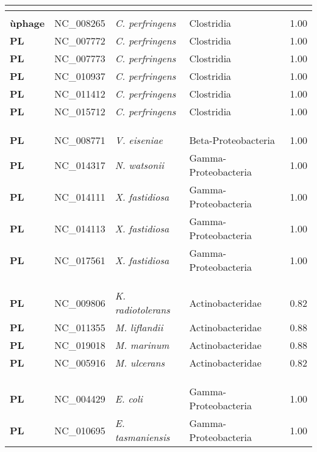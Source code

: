 \begin{adjustwidth}{-3cm}{2cm}
{\begin{supertabular}{>{\bfseries}l|p{0.1\textwidth}p{0.14\textwidth}l|l}
\\
\hline\\
ùphage & NC\_008265 & \textit{C. perfringens} & Clostridia & 1.00\\
PL & NC\_007772 & \textit{C. perfringens} & Clostridia & 1.00\\
PL & NC\_007773 & \textit{C. perfringens} & Clostridia & 1.00\\
PL & NC\_010937 & \textit{C. perfringens} & Clostridia & 1.00\\
PL & NC\_011412 & \textit{C. perfringens} & Clostridia & 1.00\\
PL & NC\_015712 & \textit{C. perfringens} & Clostridia & 1.00\\
\\
\\
\hline\\
PL & NC\_008771 & \textit{V. eiseniae} & Beta-Proteobacteria & 1.00\\
PL & NC\_014317 & \textit{N. watsonii} & Gamma-Proteobacteria & 1.00\\
PL & NC\_014111 & \textit{X. fastidiosa} & Gamma-Proteobacteria & 1.00\\
PL & NC\_014113 & \textit{X. fastidiosa} & Gamma-Proteobacteria & 1.00\\
PL & NC\_017561 & \textit{X. fastidiosa} & Gamma-Proteobacteria & 1.00\\
\\
\\
\hline\\
PL & NC\_009806 & \textit{K. radiotolerans} & Actinobacteridae & 0.82\\
PL & NC\_011355 & \textit{M. liflandii} & Actinobacteridae & 0.88\\
PL & NC\_019018 & \textit{M. marinum} & Actinobacteridae & 0.88\\
PL & NC\_005916 & \textit{M. ulcerans} & Actinobacteridae & 0.82\\
\\
\\
\hline\\
PL & NC\_004429 & \textit{E. coli} & Gamma-Proteobacteria & 1.00\\
PL & NC\_010695 & \textit{E. tasmaniensis} & Gamma-Proteobacteria & 1.00\\

\end{supertabular}}
\end{adjustwidth}
